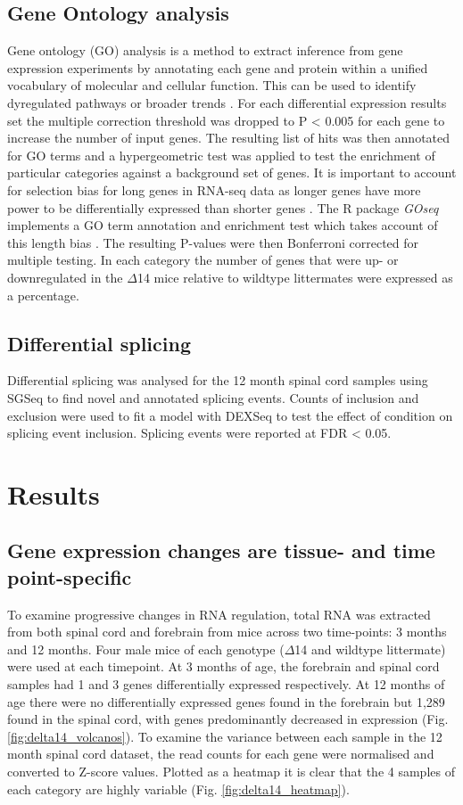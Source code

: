 \subsection{Gene Ontology analysis}
Gene ontology (GO) analysis is a method to extract inference from gene expression experiments by annotating each gene and protein within a unified vocabulary of molecular and cellular function. This can be used to identify dyregulated pathways or broader trends \citep{Ashburner2000}. For each differential expression results set the multiple correction threshold was dropped to P < 0.005 for each gene to increase the number of input genes. The resulting list of hits was then annotated for GO terms and a hypergeometric test was applied to test the enrichment of particular categories against a background set of genes. It is important to account for selection bias for long genes in RNA-seq data as longer genes have more power to be differentially expressed than shorter genes \citep{Young2010}. The R package \textit{GOseq} implements a GO term annotation and enrichment test which takes account of this length bias \citep{Young2010}. The resulting P-values were then Bonferroni corrected for multiple testing. In each category the number of genes that were up- or downregulated in the $\Delta$14 mice relative to wildtype littermates were expressed as a percentage. 

\subsection{Differential splicing}
Differential splicing was analysed for the 12 month spinal cord samples using SGSeq \citep{Goldstein2016} to find novel and annotated splicing events. Counts of inclusion and exclusion were used to fit a model with DEXSeq \citep{Anders2012} to test the effect of condition on splicing event inclusion. Splicing events were reported at FDR < 0.05.

\section{Results}

\subsection{Gene expression changes are tissue- and time point-specific}

To examine progressive changes in RNA regulation, total RNA was extracted from both spinal cord and forebrain from mice across two time-points: 3 months and 12 months. Four male mice of each genotype ($\Delta$14 and wildtype littermate) were used at each timepoint. At 3 months of age, the forebrain and spinal cord samples had 1 and 3 genes differentially expressed respectively. At 12 months of age there were no differentially expressed genes found in the forebrain but 1,289 found in the spinal cord, with genes predominantly decreased in expression (Fig. \ref{fig:delta14_volcanos}). To examine the variance between each sample in the 12 month spinal cord dataset, the read counts for each gene were normalised and converted to Z-score values. Plotted as a heatmap it is clear that the 4 samples of each category are highly variable (Fig. \ref{fig:delta14_heatmap}).

